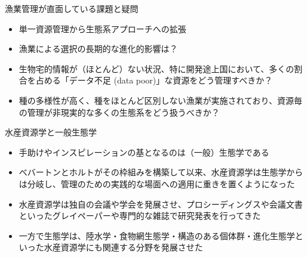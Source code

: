 \documentclass[
  ignorenonframetext,
]{beamer}
\providecommand{\tightlist}{%
  \setlength{\itemsep}{0pt}\setlength{\parskip}{0pt}}
\begin{document}
\begin{frame}{漁業管理が直面している課題と疑問}
\protect\hypertarget{ux6f01ux696dux7ba1ux7406ux304cux76f4ux9762ux3057ux3066ux3044ux308bux8ab2ux984cux3068ux7591ux554f}{}

\begin{itemize}
\tightlist
\item
  単一資源管理から生態系アプローチへの拡張\\
  \vspace{6mm}
\item
  漁業による選択の長期的な進化的影響は？\\
  \vspace{6mm}
\item
  生物宅的情報が（ほとんど）ない状況、特に開発途上国において、多くの割合を占める「データ不足
  (data poor)」な資源をどう管理すべきか？\\
  \vspace{6mm}
\item
  種の多様性が高く、種をほとんど区別しない漁業が実施されており、資源毎の管理が非現実的な多くの生態系をどう扱うべきか？
\end{itemize}

\end{frame}

\begin{frame}{水産資源学と一般生態学}
\protect\hypertarget{ux6c34ux7523ux8cc7ux6e90ux5b66ux3068ux4e00ux822cux751fux614bux5b66}{}

\begin{itemize}
\tightlist
\item
  手助けやインスピレーションの基となるのは（一般）生態学である\\
  \vspace{6mm}
\item
  べバートンとホルトがその枠組みを構築して以来、水産資源学は生態学からは分岐し、管理のための実践的な場面への適用に重きを置くようになった\\
  \vspace{6mm}
\item
  水産資源学は独自の会議や学会を発展させ、プロシーディングスや会議文書といったグレイペーパーや専門的な雑誌で研究発表を行ってきた\\
  \vspace{6mm}
\item
  一方で生態学は、陸水学・食物網生態学・構造のある個体群・進化生態学といった水産資源学にも関連する分野を発展させた
\end{itemize}

\end{frame}
\end{document}
